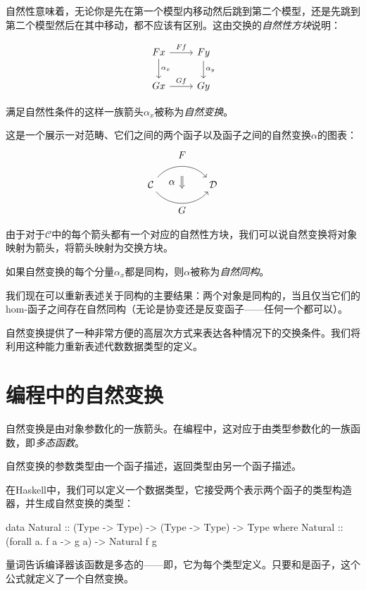 \documentclass[DaoFP]{subfiles}
\begin{document}
自然性意味着，无论你是先在第一个模型内移动然后跳到第二个模型，还是先跳到第二个模型然后在其中移动，都不应该有区别。这由交换的\emph{自然性方块}说明：

\[
 \begin{tikzcd}
 F x
 \arrow[d, "\alpha_x"]
 \arrow[r, "F f"]
 &
F y
  \arrow[d, "\alpha_y"]
 \\
G x
 \arrow[r, "G f"]
& G y
 \end{tikzcd}
\]

满足自然性条件的这样一族箭头$\alpha_x$被称为\emph{自然变换}。

这是一个展示一对范畴、它们之间的两个函子以及函子之间的自然变换$\alpha$的图表：
\[
\begin{tikzcd}[column sep=huge]
\mathcal{C}
  \arrow[bend left=50]{r}[name=U, label=above:$F$]{}
  \arrow[bend right=50]{r}[name=D, label=below:$G$]{} 
 &
\mathcal{D}
  \arrow[shorten <=10pt,shorten >=10pt,Rightarrow,to path={(U) -- node[label=left:$\alpha$] {} (D)}]{}
\end{tikzcd}
\]

由于对于$\mathcal{C}$中的每个箭头都有一个对应的自然性方块，我们可以说自然变换将对象映射为箭头，将箭头映射为交换方块。

如果自然变换的每个分量$\alpha_x$都是同构，则$\alpha$被称为\emph{自然同构}。

我们现在可以重新表述关于同构的主要结果：两个对象是同构的，当且仅当它们的hom-函子之间存在自然同构（无论是协变还是反变函子——任何一个都可以）。

自然变换提供了一种非常方便的高层次方式来表达各种情况下的交换条件。我们将利用这种能力重新表述代数数据类型的定义。


\section{编程中的自然变换}

自然变换是由对象参数化的一族箭头。在编程中，这对应于由类型参数化的一族函数，即\emph{多态函数}。

自然变换的参数类型由一个函子描述，返回类型由另一个函子描述。

在Haskell中，我们可以定义一个数据类型，它接受两个表示两个函子的类型构造器，并生成自然变换的类型：

\begin{haskell}
data Natural :: (Type -> Type) -> (Type -> Type) -> Type where
  Natural :: (forall a. f a -> g a) -> Natural f g
\end{haskell}
量词告诉编译器该函数是多态的——即，它为每个类型定义。只要和是函子，这个公式就定义了一个自然变换。
\end{document}

